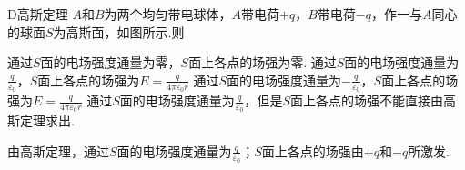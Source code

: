 \begin{paracol}{2}
\begin{choice}{D}{高斯定理}
    $A$和$B$为两个均匀带电球体，$A$带电荷$+q$，$B$带电荷$-q$，作一与$A$同心的球面$S$为高斯面，如图所示.则
    \begin{tasks}
        \task 通过$S$面的电场强度通量为零，$S$面上各点的场强为零.
        \task 通过$S$面的电场强度通量为$\frac{q}{\varepsilon_0}$，$S$面上各点的场强为$E=\frac{q}{4\pi\varepsilon_0r}$
        \task 通过$S$面的电场强度通量为$-\frac{q}{\varepsilon_0}$，$S$面上各点的场强为$E=\frac{q}{4\pi\varepsilon_0r}$
        \task 通过$S$面的电场强度通量为$\frac{q}{\varepsilon_0}$，但是$S$面上各点的场强不能直接由高斯定理求出.
    \end{tasks}
\end{choice}
\switchcolumn\centering
\vfill
{}
\vfill
\end{paracol}
\begin{solution}
    由高斯定理，通过$S$面的电场强度通量为$\frac{q}{\varepsilon_0}$；$S$面上各点的场强由$+q$和$-q$所激发.
\end{solution}

